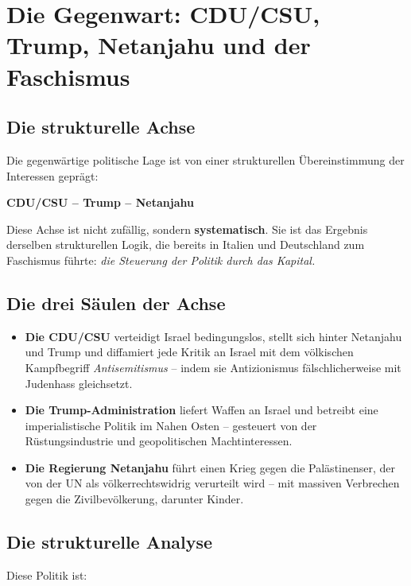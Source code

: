 \section{Die Gegenwart: CDU/CSU, Trump, Netanjahu und der Faschismus}

\subsection{Die strukturelle Achse}

Die gegenwärtige politische Lage ist von einer strukturellen Übereinstimmung der Interessen geprägt:

\begin{center}
\Large\textbf{CDU/CSU – Trump – Netanjahu}
\end{center}

Diese Achse ist nicht zufällig, sondern \textbf{systematisch}. Sie ist das Ergebnis derselben strukturellen Logik, die bereits in Italien und Deutschland zum Faschismus führte: \emph{die Steuerung der Politik durch das Kapital.}

\subsection{Die drei Säulen der Achse}

\begin{itemize}
    \item \textbf{Die CDU/CSU} verteidigt Israel bedingungslos, stellt sich hinter Netanjahu und Trump und diffamiert jede Kritik an Israel mit dem völkischen Kampfbegriff \emph{Antisemitismus} – indem sie Antizionismus fälschlicherweise mit Judenhass gleichsetzt.
    \item \textbf{Die Trump-Administration} liefert Waffen an Israel und betreibt eine imperialistische Politik im Nahen Osten – gesteuert von der Rüstungsindustrie und geopolitischen Machtinteressen.
    \item \textbf{Die Regierung Netanjahu} führt einen Krieg gegen die Palästinenser, der von der UN als völkerrechtswidrig verurteilt wird – mit massiven Verbrechen gegen die Zivilbevölkerung, darunter Kinder.
\end{itemize}

\subsection{Die strukturelle Analyse}

Diese Politik ist:

